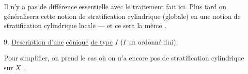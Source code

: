 Il n'y a pas de différence essentielle avec
le traitement fait ici. Plus tard on
généralisera cette notion de stratification
cylindrique (globale) en une notion de
stratification cylindrique locale --- et ce sera
la même .

9. \uline{Description d'une} 
 \uline{cônique} \uline{de type} \(I\)
(\(I\) un ordonné fini).

Pour simplifier, on prend  le cas où on
n'a encore pas de stratification cylindrique
sur \(X\) .



